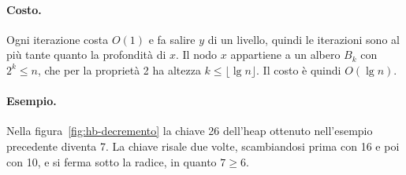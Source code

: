 \paragraph{Costo.}
Ogni iterazione costa $O(1)$ e fa salire $y$ di un livello, quindi le iterazioni sono al più tante quanto la profondità di $x$. Il nodo $x$ appartiene a un albero $B_k$ con $2^k \le n$, che per la proprietà 2 ha altezza $k \le \lfloor \lg n \rfloor$. Il costo è quindi $O(\lg n)$.

\paragraph{Esempio.}
Nella figura~\ref{fig:hb-decremento} la chiave 26 dell'heap ottenuto nell'esempio precedente diventa 7. La chiave risale due volte, scambiandosi prima con 16 e poi con 10, e si ferma sotto la radice, in quanto $7 \ge 6$.

